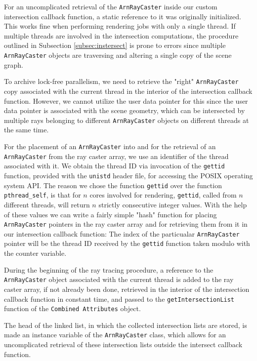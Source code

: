 For an uncomplicated retrieval of the \texttt{ArnRayCaster} inside our custom intersection callback function, a static reference to it was originally initialized. This works fine when performing rendering jobs with only a single thread. If multiple threads are involved in the intersection computations, the procedure outlined in Subsection \ref{subsec:instersect} is prone to errors since multiple \texttt{ArnRayCaster} objects are traversing and altering a single copy of the scene graph.

To archive lock-free parallelism, we need to retrieve the "right" \texttt{ArnRayCaster} copy associated with the current thread in the interior of the intersection callback function. However, we cannot utilize the user data pointer for this since the user data pointer is associated with the scene geometry, which can be intersected by multiple rays belonging to different \texttt{ArnRayCaster} objects on different threads at the same time.

For the placement of an \texttt{ArnRayCaster} into and for the retrieval of an \texttt{ArnRayCaster} from the ray caster array, we use an identifier of the thread associated with it. We obtain the thread ID via invocation of the \texttt{gettid} function, provided with the \texttt{unistd} header file, for accessing the POSIX operating system API. The reason we chose the function \texttt{gettid} over the function \texttt{pthread\_self}, is that for $n$ cores involved for rendering, \texttt{gettid}, called from $n$ different threads, will return $n$ strictly consecutive integer values. With the help of these values we can write a fairly simple "hash" function for placing \texttt{ArnRayCaster} pointers in the ray caster array and for retrieving them from it in our intersection callback function: The index of the particualar \texttt{ArnRayCaster} pointer will be the thread ID received by the \texttt{gettid} function taken modulo with the counter variable.

During the beginning of the ray tracing procedure, a reference to the  \texttt{ArnRayCaster} object associated with the current thread is added to the ray caster array, if not already been done, retrieved in the interior of the intersection callback function in constant time, and passed to the \texttt{getIntersectionList} function of the \texttt{Combined Attributes} object. 

The head of the linked list, in which the collected intersection lists are stored, is made an instance variable of the \texttt{ArnRayCaster} class, which allows for an uncomplicated retrieval of these intersection lists outside the intersect callback function. 

